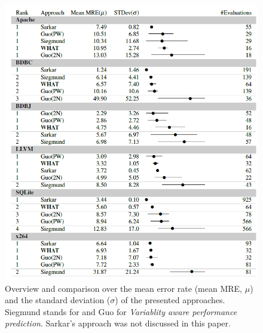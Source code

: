 \begin{figure}[t]
	\centering
	\includegraphics[width=\linewidth]{figures/OverviewPerformance}
	\caption{Overview and comparison over the mean error rate (mean MRE, $\mu$) and the standard deviation ($\sigma$) of the presented approaches. Siegmund stands for \AFID and Guo for \textit{Variablity aware performance prediction}. Sarkar's approach was not discussed in this paper.
		  \cite{FasterDiscoveryofFasterSystemConfigurationsSiegmund2017}}
	\label{fig:ConclusionPerformanceOverview}
\end{figure}
\FloatBarrier